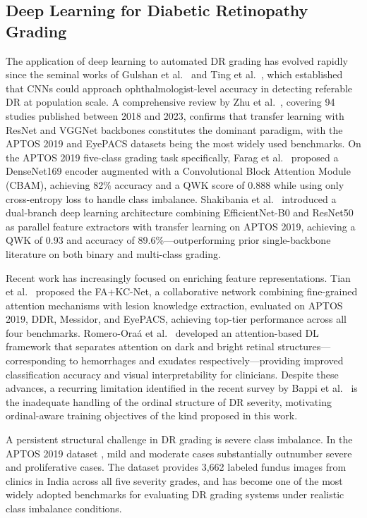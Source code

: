 \documentclass[a4paper,fleqn]{cas-dc}
\begin{document}
\subsection{Deep Learning for Diabetic Retinopathy Grading}

The application of deep learning to automated DR grading has evolved rapidly since the seminal works of Gulshan et al.\ \cite{gulshan2016} and Ting et al.\ \cite{ting2017}, which established that CNNs could approach ophthalmologist-level accuracy in detecting referable DR at population scale. A comprehensive review by Zhu et al.\ \cite{zhu2024}, covering 94 studies published between 2018 and 2023, confirms that transfer learning with ResNet and VGGNet backbones constitutes the dominant paradigm, with the APTOS 2019 and EyePACS datasets being the most widely used benchmarks. On the APTOS 2019 five-class grading task specifically, Farag et al.\ \cite{farag2022} proposed a DenseNet169 encoder augmented with a Convolutional Block Attention Module (CBAM), achieving 82\% accuracy and a QWK score of 0.888 while using only cross-entropy loss to handle class imbalance. Shakibania et al.\ \cite{shakibania2024} introduced a dual-branch deep learning architecture combining EfficientNet-B0 and ResNet50 as parallel feature extractors with transfer learning on APTOS 2019, achieving a QWK of 0.93 and accuracy of 89.6\%---outperforming prior single-backbone literature on both binary and multi-class grading.

Recent work has increasingly focused on enriching feature representations. Tian et al.\ \cite{tian2023} proposed the FA+KC-Net, a collaborative network combining fine-grained attention mechanisms with lesion knowledge extraction, evaluated on APTOS 2019, DDR, Messidor, and EyePACS, achieving top-tier performance across all four benchmarks. Romero-Ora\'{a} et al.\ \cite{romero2024} developed an attention-based DL framework that separates attention on dark and bright retinal structures---corresponding to hemorrhages and exudates respectively---providing improved classification accuracy and visual interpretability for clinicians. Despite these advances, a recurring limitation identified in the recent survey by Bappi et al.\ \cite{bappi2025} is the inadequate handling of the ordinal structure of DR severity, motivating ordinal-aware training objectives of the kind proposed in this work.

A persistent structural challenge in DR grading is severe class imbalance. In the APTOS 2019 dataset \cite{aptos2019}, mild and moderate cases substantially outnumber severe and proliferative cases. The dataset provides 3,662 labeled fundus images from clinics in India across all five severity grades, and has become one of the most widely adopted benchmarks for evaluating DR grading systems under realistic class imbalance conditions.
\end{document}
